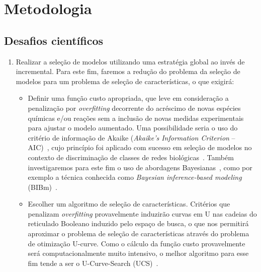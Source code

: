 \documentclass[12pt]{article}
\begin{document}

\section{Metodologia}



\subsection{Desafios científicos}

\begin{enumerate}

\item Realizar a seleção de modelos utilizando uma estratégia global ao invés de incremental. Para este fim, faremos a redução do problema da seleção de modelos para um problema de seleção de características, o que exigirá:
\begin{itemize}
  \item Definir uma função custo apropriada, que leve em consideração a penalização por {\em overfitting} decorrente do acréscimo de novas espécies químicas e/ou reações sem a inclusão de novas medidas experimentais para ajustar o modelo aumentado. Uma possibilidade seria o uso do critério de informação de Akaike ({\em Akaike's Information Criterion} -- AIC)~\cite{bozdogan1987model}, cujo princípio foi aplicado com sucesso em seleção de modelos no contexto de discriminação de classes de redes biológicas~\cite{takahashi2012discriminating}. Também investigaremos para este fim o uso de abordagens Bayesianas~\cite{kirk2013model}, como por exemplo a técnica conhecida como {\em Bayesian inference-based modeling} (BIBm)~\cite{Xu2010}.

  \item Escolher um algoritmo de seleção de características. Critérios que penalizam {\em overfitting} provavelmente induzirão curvas em U nas cadeias do reticulado Booleano induzido pelo espaço de busca, o que nos permitirá aproximar o problema de seleção de características através do problema de otimização U-curve. Como o cálculo da função custo provavelmente será computacionalmente muito intensivo, o melhor algoritmo para esse fim tende a ser o U-Curve-Search (UCS)~\cite{reis2012minimizaccao,reis2017ucsr}.
\end{itemize}


\end{enumerate}
\end{document}

